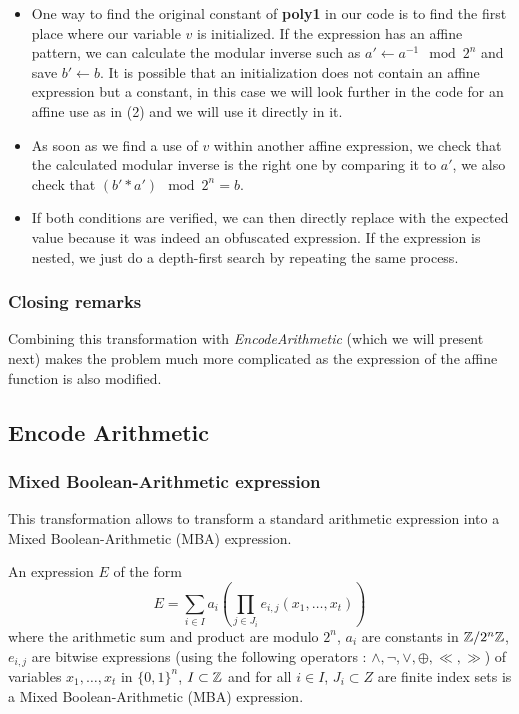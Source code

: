 \documentclass{projectreport}
\begin{document}
\begin{itemize}
    \item One way to find the original constant of \textbf{\textsf{poly1}} in our code is to find the first place where our variable $v$ is initialized. If the expression has an affine pattern, we can calculate the modular inverse such as $a' \gets a^{-1} \mod 2^n$ and save $b' \gets b$. It is possible that an initialization does not contain an affine expression but a constant, in this case we will look further in the code for an affine use as in (2) and we will use it directly in it.
    \item As soon as we find a use of $v$ within another affine expression, we check that the calculated modular inverse is the right one by comparing it to $a'$, we also check that $(b' * a') \mod 2^n = b$.
    \item If both conditions are verified, we can then directly replace with the expected value because it was indeed an obfuscated expression. If the expression is nested, we just do a depth-first search by repeating the same process.
\end{itemize}

\subsubsection{Closing remarks}

Combining this transformation with \textit{EncodeArithmetic} (which we will present next) makes the problem much more complicated as the expression of the affine function is also modified.

\subsection{Encode Arithmetic}

\subsubsection{Mixed Boolean-Arithmetic expression}

This transformation allows to transform a standard arithmetic expression into a Mixed Boolean-Arithmetic (\textsf{MBA}) expression.

\begin{definition} An expression $E$ of the form
\begin{equation}
    E = \sum_{i \in I} a_i (\prod_{j \in J_i} e_{i, j}(x_1, \ldots, x_t ))
\end{equation}
where the arithmetic sum and product are modulo $2^n$, $a_i$ are constants in $\mathbb Z/2^n\mathbb Z$, $e_{i,j}$ are bitwise
expressions (using the following operators : $\wedge, \neg, \lor, \oplus, \ll, \gg$) of variables $x_1, \ldots, x_t $ in $\{0, 1\}^n$, $I \subset \mathbb Z $ and for all $i \in I$, $J_i \subset Z$ are finite index sets is a Mixed Boolean-Arithmetic (\textsf{MBA}) expression.

\end{definition}
\end{document}
